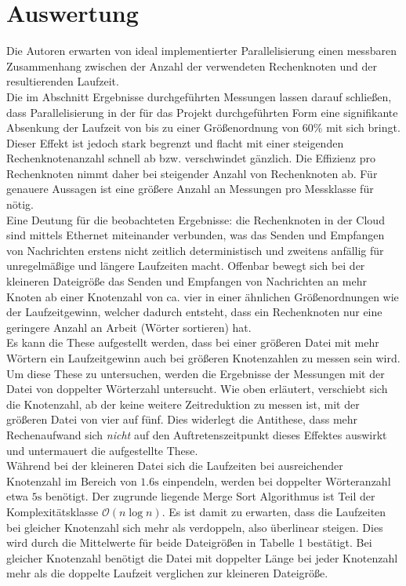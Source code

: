 \section{Auswertung}
Die Autoren erwarten von ideal implementierter Parallelisierung einen messbaren Zusammenhang zwischen der Anzahl der verwendeten Rechenknoten und der resultierenden Laufzeit.
\\
Die im Abschnitt Ergebnisse durchgeführten Messungen lassen darauf schließen, dass Parallelisierung in der für das Projekt durchgeführten Form eine signifikante Absenkung der Laufzeit von bis zu einer Größenordnung von 60\% mit sich bringt. Dieser Effekt ist jedoch stark begrenzt und flacht mit einer steigenden Rechenknotenanzahl schnell ab bzw. verschwindet gänzlich. Die Effizienz pro Rechenknoten nimmt daher bei steigender Anzahl von Rechenknoten ab. Für genauere Aussagen ist eine größere Anzahl an Messungen pro Messklasse für nötig.
\\
Eine Deutung für die beobachteten Ergebnisse: die Rechenknoten in der Cloud sind mittels Ethernet miteinander verbunden, was das Senden und Empfangen von Nachrichten erstens nicht zeitlich deterministisch und zweitens anfällig für unregelmäßige und längere Laufzeiten macht. Offenbar bewegt sich bei der kleineren Dateigröße das Senden und Empfangen von Nachrichten an mehr Knoten ab einer Knotenzahl von ca. vier in einer ähnlichen Größenordnungen wie der Laufzeitgewinn, welcher dadurch entsteht, dass ein Rechenknoten nur eine geringere Anzahl an Arbeit (Wörter sortieren) hat. 
\\
Es kann die These aufgestellt werden, dass bei einer größeren Datei mit mehr Wörtern ein Laufzeitgewinn auch bei größeren Knotenzahlen zu messen sein wird.
Um diese These zu untersuchen, werden die Ergebnisse der Messungen mit der Datei von doppelter Wörterzahl untersucht. Wie oben erläutert, verschiebt sich die Knotenzahl, ab der keine weitere Zeitreduktion zu messen ist, mit der größeren Datei von vier auf fünf. Dies widerlegt die Antithese, dass mehr Rechenaufwand sich \textit{nicht} auf den Auftretenszeitpunkt dieses Effektes auswirkt und untermauert die aufgestellte These.
\\
Während bei der kleineren Datei sich die Laufzeiten bei ausreichender Knotenzahl im Bereich von $1.6\text{s}$ einpendeln, werden bei doppelter Wörteranzahl etwa $5\text{s}$ benötigt. Der zugrunde liegende Merge Sort Algorithmus ist Teil der Komplexitätsklasse ${\mathcal{O}(n\log{n})}$. Es ist damit zu erwarten, dass die Laufzeiten bei gleicher Knotenzahl sich mehr als verdoppeln, also überlinear steigen. Dies wird durch die Mittelwerte für beide Dateigrößen in Tabelle 1 bestätigt. Bei gleicher Knotenzahl benötigt die Datei mit doppelter Länge bei jeder Knotenzahl mehr als die doppelte Laufzeit verglichen zur kleineren Dateigröße.
